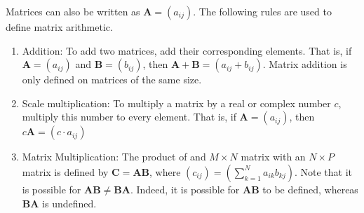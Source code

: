\documentclass[crop=false,class=book,oneside]{standalone}                      %
\begin{document}
        Matrices can also be written as $\mathbf{A}=(a_{ij})$.
        The following rules are used to
        define matrix arithmetic.
        \begin{enumerate}
            \item Addition: To add two matrices, add their
                corresponding elements. That is, if
                $\mathbf{A}=(a_{ij})$ and $\mathbf{B}=(b_{ij})$,
                then $\mathbf{A}+\mathbf{B}=(a_{ij}+b_{ij})$.
                Matrix addition is only defined on matrices of
                the same size.
            \item Scale multiplication: To multiply a
                matrix by a real or complex number $c$,
                multiply this number to every element. That is,
                if $\mathbf{A}=(a_{ij})$, then
                $c\mathbf{A}=({c}\cdot{a_{ij}})$
            \item Matrix Multiplication: The product of
                and ${M}\times{N}$ matrix with an
                ${N}\times{P}$ matrix is defined by
                $\mathbf{C}=\mathbf{A}\mathbf{B}$, where
                $(c_{ij})=(\sum_{k=1}^{N}a_{ik}b_{kj})$. Note
                that it is possible for
                $\mathbf{A}\mathbf{B}\ne\mathbf{B}\mathbf{A}$.
                Indeed, it is possible for
                $\mathbf{A}\mathbf{B}$ to be defined, whereas
                $\mathbf{B}\mathbf{A}$ is undefined.
        \end{enumerate}
\end{document}
